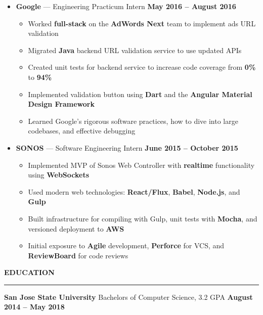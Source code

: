 \documentclass[10pt, oneside]{letter}
\newcommand{\linespaceshit} {
  \vspace{0.05in}
  \hrule
  \vspace{0.05in}
}
\begin{document}
\begin{adjustwidth}{0.1in}{0pt}
\begin{itemize}
      \item {
        \textbf{Google} --- Engineering Practicum Intern
        \hfill
        \textbf{May 2016 -- August 2016}
      }
      \begin{itemize}
        \item {
          Worked \textbf{full-stack} on the \textbf{AdWords Next} team to
          implement ads URL validation
        }
        \item {
          Migrated \textbf{Java} backend URL validation service to use
          updated APIs
        }
        \item {
          Created unit tests for backend service to increase code coverage
          from \textbf{0\%} to \textbf{94\%}
        }
        \item {
          Implemented validation button using \textbf{Dart} and the
          \textbf{Angular Material Design Framework}
        }
        \item {
          Learned Google's rigorous software practices, how to dive into
          large codebases, and effective debugging
        }
      \end{itemize}

      \item {
        \textbf{SONOS} --- Software Engineering Intern
        \hfill
        \textbf{June 2015 -- October 2015}
      }
      \begin{itemize}
        \item {
          Implemented MVP of Sonos Web Controller with \textbf{realtime}
          functionality using \textbf{WebSockets}
        }
        \item {
          Used modern web technologies: \textbf{React/Flux},
          \textbf{Babel}, \textbf{Node.js}, and \textbf{Gulp}
        }
        \item {
          Built infrastructure for compiling with Gulp, unit tests with
          \textbf{Mocha}, and versioned deployment to \textbf{AWS}
        }
        \item {
          Initial exposure to \textbf{Agile} development, \textbf{Perforce}
          for VCS, and \textbf{ReviewBoard} for code reviews
        }
      \end{itemize}
    \end{itemize}
  \end{adjustwidth}

  \textbf{EDUCATION}
  \linespaceshit
    \begin{adjustwidth}{0.1in}{0pt}
      \textbf{San Jose State University} \hfill Bachelors of Computer Science, 3.2 GPA \hfill \textbf{August 2014 -- May 2018}
    \end{adjustwidth}
\end{document}
